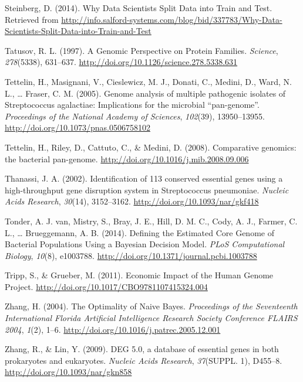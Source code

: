 \documentclass[]{report}
\begin{document}
\hypertarget{ref-Steinberg2014}{}
Steinberg, D. (2014). Why Data Scientists Split Data into Train and
Test. Retrieved from
\url{http://info.salford-systems.com/blog/bid/337783/Why-Data-Scientists-Split-Data-into-Train-and-Test}

\hypertarget{ref-Tatusov1997}{}
Tatusov, R. L. (1997). A Genomic Perspective on Protein Families.
\emph{Science}, \emph{278}(5338), 631--637.
\url{http://doi.org/10.1126/science.278.5338.631}

\hypertarget{ref-Tettelin2005}{}
Tettelin, H., Masignani, V., Cieslewicz, M. J., Donati, C., Medini, D.,
Ward, N. L., \ldots{} Fraser, C. M. (2005). Genome analysis of multiple
pathogenic isolates of Streptococcus agalactiae: Implications for the
microbial ``pan-genome''. \emph{Proceedings of the National Academy of
Sciences}, \emph{102}(39), 13950--13955.
\url{http://doi.org/10.1073/pnas.0506758102}

\hypertarget{ref-Tettelin2008}{}
Tettelin, H., Riley, D., Cattuto, C., \& Medini, D. (2008). Comparative
genomics: the bacterial pan-genome.
\url{http://doi.org/10.1016/j.mib.2008.09.006}

\hypertarget{ref-Thanassi2002}{}
Thanassi, J. A. (2002). Identification of 113 conserved essential genes
using a high-throughput gene disruption system in Streptococcus
pneumoniae. \emph{Nucleic Acids Research}, \emph{30}(14), 3152--3162.
\url{http://doi.org/10.1093/nar/gkf418}

\hypertarget{ref-VanTonder2014}{}
Tonder, A. J. van, Mistry, S., Bray, J. E., Hill, D. M. C., Cody, A. J.,
Farmer, C. L., \ldots{} Brueggemann, A. B. (2014). Defining the
Estimated Core Genome of Bacterial Populations Using a Bayesian Decision
Model. \emph{PLoS Computational Biology}, \emph{10}(8), e1003788.
\url{http://doi.org/10.1371/journal.pcbi.1003788}

\hypertarget{ref-Tripp2011}{}
Tripp, S., \& Grueber, M. (2011). Economic Impact of the Human Genome
Project. \url{http://doi.org/10.1017/CBO9781107415324.004}

\hypertarget{ref-Zhang2004}{}
Zhang, H. (2004). The Optimality of Naive Bayes. \emph{Proceedings of
the Seventeenth International Florida Artificial Intelligence Research
Society Conference FLAIRS 2004}, \emph{1}(2), 1--6.
\url{http://doi.org/10.1016/j.patrec.2005.12.001}

\hypertarget{ref-Zhang2009}{}
Zhang, R., \& Lin, Y. (2009). DEG 5.0, a database of essential genes in
both prokaryotes and eukaryotes. \emph{Nucleic Acids Research},
\emph{37}(SUPPL. 1), D455--8. \url{http://doi.org/10.1093/nar/gkn858}


\printbibliography
\end{document}
